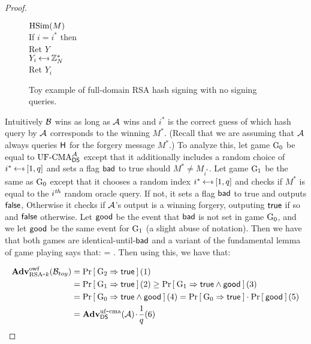 \begin{proof}
\begin{figure}
{\underline{$\textnormal{HSim}(M)$}\\
If $i = i^*$ then\\
\myInd Ret $Y$\\
$Y_i \getsr \Z_N^*$\\
Ret $Y_i$
}
  \caption{Toy example of full-domain RSA hash signing with no signing queries.}
\label{fig:fulldomaintoy}
\end{figure}


Intuitively ${\mathcal B}$ wins as long as ${\mathcal A}$ wins and $i^*$ is the correct guess
of which hash query by ${\mathcal A}$ corresponds to the winning $M^*$. (Recall that we
are assuming that ${\mathcal A}$ always queries $\mathsf{H}$ for the forgery message
$M^*$.) To analyze this, let game ${{\textnormal G}}_0$ be equal to $\textnormal{UF-CMA}_{{\mathsf{DS}}}^{\mathcal A}$ except
that it additionally includes a random choice of $i^* \getsr [1,q]$ and sets a
flag $\mathsf{bad}$ to true should $M^* \ne M_{i^*}$. Let
game ${{\textnormal G}}_1$ be the same as ${{\textnormal G}}_0$ except that  it chooses a random index $i^*
\getsr [1,q]$ and checks if $M^*$ is equal to the $i^{\textit{th}}$ random oracle
query. If not, it sets a flag $\mathsf{bad}$ to true and outputs $\mathsf{false}$, 
Otherwise it checks if ${\mathcal A}$'s output is a winning forgery, outputing
$\mathsf{true}$ if so and $\mathsf{false}$ otherwise. Let $\mathsf{good}$ be the event that $\mathsf{bad}$ is
not set in game ${{\textnormal G}}_0$, and we let $\mathsf{good}$ be the same event for ${{\textnormal G}}_1$ (a
slight abuse of notation). Then we have that both games are
identical-until-$\mathsf{bad}$ and a variant of the fundamental lemma of game playing
says that:
\bnm
  \Prob{\G_0 \Rightarrow\true \land\good} = \Prob{\G_1\Rightarrow\true \land
  \good} \;.
\enm
Then using this, we have that:
\iffalse
\begin{align*}
\AdvOWF{\RSAk}{\advB_{toy}} 
  &\ge \Prob{\G_0\Rightarrow\true\land\good} (2)\\
  &= \Prob{\G_1\Rightarrow\true\land\good} (3)\\
  &= \Prob{\G_1\Rightarrow\true}\cdot\Prob{\good} (4)\\
  &= \AdvUFCMA{\DS}{\advA}\cdotsm\frac{1}{q_h} (5)
\end{align*}
\fi

\begin{align*}
\mathbf{Adv}^{\mathrm{owf}}_{{\textnormal{RSA}\mbox{-} k}}({\mathcal B}_{toy}) 
  &= \Pr\left[\: {{\textnormal G}}_2\Rightarrow\mathsf{true} \:\right] (1) \\
  &= \Pr\left[\: {{\textnormal G}}_1\Rightarrow\mathsf{true} \:\right] (2)
  \ge \Pr\left[\: {{\textnormal G}}_1\Rightarrow\mathsf{true}\land\mathsf{good} \:\right] (3)\\
  &= \Pr\left[\: {{\textnormal G}}_0\Rightarrow\mathsf{true}\land\mathsf{good} \:\right] (4)
  = \Pr\left[\: {{\textnormal G}}_0\Rightarrow\mathsf{true} \:\right]\cdot\Pr\left[\: \mathsf{good} \:\right] (5)\\
  &= \mathbf{Adv}^{\mathrm{uf\mbox{-} cma}}_{{\mathsf{DS}}}({\mathcal A}){\hspace{-0.1ex}}{\hspace{-0.1ex}}{\hspace{-0.1ex}}\cdot{\hspace{-0.1ex}}{\hspace{-0.1ex}}{\hspace{-0.1ex}}\frac{1}{q} (6)
\end{align*}



\end{proof}
